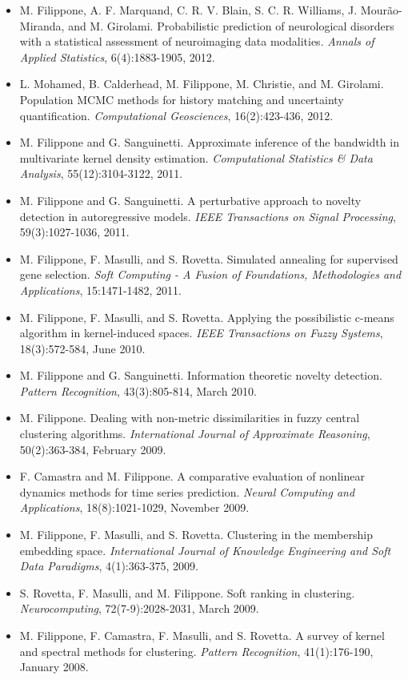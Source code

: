\begin{itemize}
\item  M. Filippone, A. F. Marquand, C. R. V. Blain, S. C. R. Williams, J. Mour\~ao-Miranda, and M. Girolami. Probabilistic prediction of neurological disorders with a statistical assessment of neuroimaging data modalities. \emph{Annals of Applied Statistics}, 6(4):1883-1905, 2012.  
\item  L. Mohamed, B. Calderhead, M. Filippone, M. Christie, and M. Girolami. Population MCMC methods for history matching and uncertainty quantification. \emph{Computational Geosciences}, 16(2):423-436, 2012.  
\item  M. Filippone and G. Sanguinetti. Approximate inference of the bandwidth in multivariate kernel density estimation. \emph{Computational Statistics \& Data Analysis}, 55(12):3104-3122, 2011.  
\item  M. Filippone and G. Sanguinetti. A perturbative approach to novelty detection in autoregressive models. \emph{IEEE Transactions on Signal Processing}, 59(3):1027-1036, 2011.  
\item  M. Filippone, F. Masulli, and S. Rovetta. Simulated annealing for supervised gene selection. \emph{Soft Computing - A Fusion of Foundations, Methodologies and Applications}, 15:1471-1482, 2011.  
\item  M. Filippone, F. Masulli, and S. Rovetta. Applying the possibilistic c-means algorithm in kernel-induced spaces. \emph{IEEE Transactions on Fuzzy Systems}, 18(3):572-584, June 2010.  
\item  M. Filippone and G. Sanguinetti. Information theoretic novelty detection. \emph{Pattern Recognition}, 43(3):805-814, March 2010.  
\item  M. Filippone. Dealing with non-metric dissimilarities in fuzzy central clustering algorithms. \emph{International Journal of Approximate Reasoning}, 50(2):363-384, February 2009.  
\item  F. Camastra and M. Filippone. A comparative evaluation of nonlinear dynamics methods for time series prediction. \emph{Neural Computing and Applications}, 18(8):1021-1029, November 2009.  
\item  M. Filippone, F. Masulli, and S. Rovetta. Clustering in the membership embedding space. \emph{International Journal of Knowledge Engineering and Soft Data Paradigms}, 4(1):363-375, 2009. 
\item  S. Rovetta, F. Masulli, and M. Filippone. Soft ranking in clustering. \emph{Neurocomputing}, 72(7-9):2028-2031, March 2009.  
\item  M. Filippone, F. Camastra, F. Masulli, and S. Rovetta. A survey of kernel and spectral methods for clustering. \emph{Pattern Recognition}, 41(1):176-190, January 2008.  


\end{itemize}
